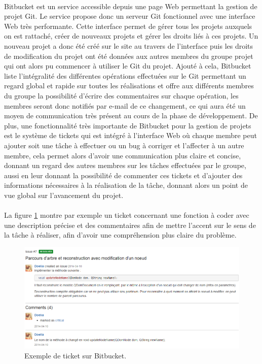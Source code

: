 \paragraph{}       
Bitbucket est un service accessible depuis une page Web permettant la gestion de projet Git. Le service propose donc un serveur Git fonctionnel avec une interface Web très performante. Cette interface permet de gérer tous les projets auxquels on est rattaché, créer de nouveaux projets et gérer les droits liés à ces projets. Un nouveau projet a donc été créé sur le site au travers de l'interface puis les droits de modification du projet ont été données aux autres membres du groupe projet qui ont alors pu commencer à utiliser le Git du projet. Ajouté à cela, Bitbucket liste l'intégralité des différentes opérations effectuées sur le Git permettant un regard global et rapide sur toutes les réalisations et offre aux différents membres du groupe la possibilité d'écrire des commentaires sur chaque opération, les membres seront donc notifiés par e-mail de ce changement, ce qui aura été un moyen de communication très présent au cours de la phase de développement. De plus, une fonctionnalité très importante de Bitbucket pour la gestion de projets est le système de tickets qui est intégré à l'interface Web où chaque membre peut ajouter soit une tâche à effectuer ou un bug à corriger et l'affecter à un autre membre, cela permet alors d'avoir une communication plus claire et concise, donnant un regard des autres membres sur les tâches effectuées par le groupe, aussi en leur donnant la possibilité de commenter ces tickets et d'ajouter des informations nécessaires à la réalisation de la tâche, donnant alors un point de vue global sur l'avancement du projet.
\paragraph{}
La figure \ref{ticket_Bitbucket} montre par exemple un ticket concernant une fonction à coder avec une description précise et des commentaires afin de mettre l'accent sur le sens de la tâche à réaliser, afin d'avoir une compréhension plus claire du problème.
       
\begin{figure}[!h]
      \centering
      \includegraphics[scale=0.5]{images/bitbucket-exemple-issue.png}
      \caption[Exemple de ticket sur Bitbucket]{Exemple de ticket sur Bitbucket.}
      \label{ticket_Bitbucket}
\end{figure}

